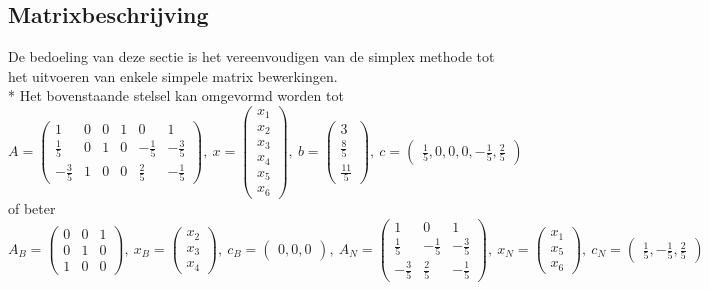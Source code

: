 \documentclass[10pt]{article}
\begin{document}
\subsection{Matrixbeschrijving}
De bedoeling van deze sectie is het vereenvoudigen van de simplex methode tot het uitvoeren van enkele simpele matrix bewerkingen.\\*
Het bovenstaande stelsel kan omgevormd worden tot
\[
 A = \begin{pmatrix}
  1 & 0 & 0 & 1 & 0 & 1 \\
  \frac{1}{5} & 0 & 1 & 0 & -\frac{1}{5} & -\frac{3}{5} \\
  -\frac{3}{5} & 1 & 0 & 0 & \frac{2}{5} & -\frac{1}{5}
 \end{pmatrix},\ 
 x = \begin{pmatrix}
  x_1 \\
  x_2 \\
  x_3 \\
  x_4 \\
  x_5 \\
  x_6
 \end{pmatrix},\ 
 b = \begin{pmatrix}
  3 \\
  \frac{8}{5} \\
  \frac{11}{5}
 \end{pmatrix},\ 
 c = \begin{pmatrix}
  \frac{1}{5}, 0, 0, 0, -\frac{1}{5}, \frac{2}{5}
 \end{pmatrix}
\]
of beter
\[
 A_B = \begin{pmatrix}
  0 & 0 & 1 \\
  0 & 1 & 0 \\
  1 & 0 & 0
 \end{pmatrix},\ 
 x_B = \begin{pmatrix}
  x_2 \\
  x_3 \\
  x_4
 \end{pmatrix},\ 
 c_B = \begin{pmatrix}
  0, 0, 0
 \end{pmatrix},\ 
 A_N = \begin{pmatrix}
  1 & 0 & 1 \\
  \frac{1}{5} & -\frac{1}{5} & -\frac{3}{5} \\
  -\frac{3}{5} & \frac{2}{5} & -\frac{1}{5}
 \end{pmatrix},\ 
 x_N = \begin{pmatrix}
  x_1 \\
  x_5 \\
  x_6
 \end{pmatrix},\ 
 c_N = \begin{pmatrix}
  \frac{1}{5}, -\frac{1}{5}, \frac{2}{5}
 \end{pmatrix}
\]
\end{document}
